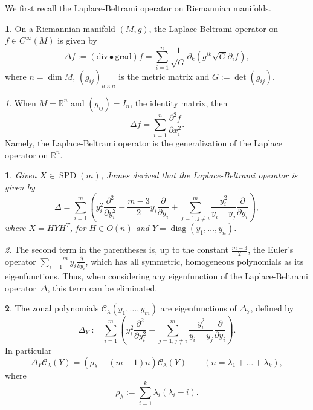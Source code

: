 \documentclass[10pt,oneside,american]{amsart}
\numberwithin{equation}{section}
\numberwithin{figure}{section}
\theoremstyle{definition}
\newtheorem{defn}{\protect\definitionname}[section]
\theoremstyle{remark}
\newtheorem{rem}{\protect\remarkname}[section]
\theoremstyle{plain}
\newtheorem{prop}{\protect\propositionname}[section]
\theoremstyle{definition}
\theoremstyle{plain}
\DeclareMathOperator{\diag}{diag}
\newcommand{\SPD}{\operatorname{SPD}}
\providecommand{\definitionname}{Definition}
\providecommand{\propositionname}{Proposition}
\providecommand{\remarkname}{Remark}
\begin{document}
We first recall the Laplace-Beltrami operator on Riemannian manifolds.
\begin{defn}
On a Riemannian manifold $\left(M,g\right)$, the Laplace-Beltrami
operator on $f\in C^{\infty}(M)$ is given by 
\[
\Delta f:=\left(\mathrm{div}\bullet\mathrm{grad}\right)f=\sum_{i=1}^{n}\frac{1}{\sqrt{G}}\partial_{k}\left(g^{ik}\sqrt{G}\partial_{i}f\right),
\]
where $n=\dim M$, $\left(g_{ij}\right)_{n\times n}$ is the metric
matrix and $G:=\det\left(g_{ij}\right)$. 
\end{defn}
\begin{rem}
When $M=\mathbb{R}^{n}$ and $\left(g_{ij}\right)=I_{n}$, the identity
matrix, then 
\[
\Delta f=\sum_{i=1}^{n}\frac{\partial^{2}f}{\partial x_{i}^{2}}.
\]
Namely, the Laplace-Beltrami operator is the generalization of the Laplace
operator on $\mathbb{R}^{n}$. 
\end{rem}
\begin{prop}
Given $X\in \SPD(m)$, James \cite[eq.~3.12, pp.~1712]{James1} derived
that the Laplace-Beltrami operator is given by
\[
\Delta=\sum_{i=1}^{m}\left(y_{i}^{2}\frac{\partial^{2}}{\partial y_{i}^{2}}-\frac{m-3}{2}y_{i}\frac{\partial}{\partial y_{i}}+\sum_{j=1,j\neq i}^{m}\frac{y_{i}^{2}}{y_{i}-y_{j}}\frac{\partial}{\partial y_{i}}\right),
\]
where $X=HYH^{T}$, for $H\in O(n)$ and $Y=\diag(y_{1},\ldots,y_{n})$. 
\end{prop}
\begin{rem}
The second term in the parentheses is, up to the constant $\frac{m-3}{2}$,
the Euler's operator $\overset{m}{\underset{i=1}{\sum}}y_{i}\frac{\partial}{\partial y_{i}}$,
which has all symmetric, homogeneous polynomials as its eigenfunctions.
Thus, when considering any eigenfunction of the Laplace-Beltrami operator~$\Delta$,
this term can be eliminated.
\end{rem}
\begin{defn}
The zonal polynomials $\mathcal{C}_{\lambda}(y_{1},\ldots,y_{m})$
are eigenfunctions of $\Delta_{Y}$, defined by
\[
  \Delta_{Y}:=\sum_{i=1}^{m}\left(y_{i}^{2}\frac{\partial^{2}}{\partial y_{i}^{2}}+\sum_{j=1,j\neq i}^{m}\frac{y_{i}^{2}}{y_{i}-y_{j}}\frac{\partial}{\partial y_{i}}\right).
\]
In particular
\[
  \Delta_{Y}\mathcal{C}_{\lambda}(Y)=\left(\rho_{\lambda}+(m-1)n\right)\mathcal{C}_{\lambda}(Y)
  \qquad (n=\lambda_1+\dots+\lambda_k),
\]
where
\begin{equation}
  \rho_{\lambda}:=\sum_{i=1}^{k}\lambda_{i}\left(\lambda_{i}-i\right).\label{eq:RHO}
\end{equation}
\end{defn}
\end{document}
